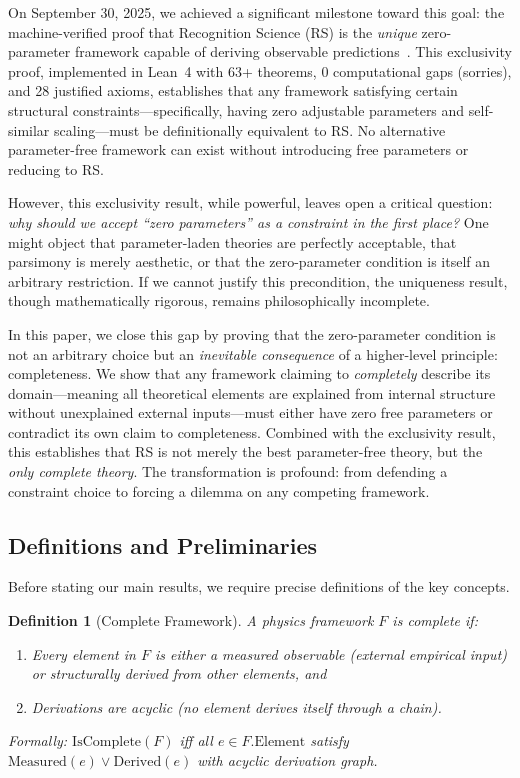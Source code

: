 \documentclass[12pt]{article}
\newtheorem{definition}[theorem]{Definition}
\theoremstyle{remark}
\begin{document}
On September 30, 2025, we achieved a significant milestone toward this goal: the machine-verified proof that Recognition Science (RS) is the \emph{unique} zero-parameter framework capable of deriving observable predictions~\cite{Washburn2025Exclusivity}. This exclusivity proof, implemented in Lean~4 with 63+ theorems, 0 computational gaps (sorries), and 28 justified axioms, establishes that any framework satisfying certain structural constraints---specifically, having zero adjustable parameters and self-similar scaling---must be definitionally equivalent to RS. No alternative parameter-free framework can exist without introducing free parameters or reducing to RS.

However, this exclusivity result, while powerful, leaves open a critical question: \emph{why should we accept ``zero parameters'' as a constraint in the first place?} One might object that parameter-laden theories are perfectly acceptable, that parsimony is merely aesthetic, or that the zero-parameter condition is itself an arbitrary restriction. If we cannot justify this precondition, the uniqueness result, though mathematically rigorous, remains philosophically incomplete.

In this paper, we close this gap by proving that the zero-parameter condition is not an arbitrary choice but an \emph{inevitable consequence} of a higher-level principle: completeness. We show that any framework claiming to \emph{completely} describe its domain---meaning all theoretical elements are explained from internal structure without unexplained external inputs---must either have zero free parameters or contradict its own claim to completeness. Combined with the exclusivity result, this establishes that RS is not merely the best parameter-free theory, but the \emph{only complete theory}. The transformation is profound: from defending a constraint choice to forcing a dilemma on any competing framework.

\subsection{Definitions and Preliminaries}

Before stating our main results, we require precise definitions of the key concepts.

\begin{definition}[Complete Framework]\label{def:complete}
A physics framework $F$ is \emph{complete} if:
\begin{enumerate}
\item[(i)] Every element in $F$ is either a measured observable (external empirical input) or structurally derived from other elements, and
\item[(ii)] Derivations are acyclic (no element derives itself through a chain).
\end{enumerate}
Formally: $\mathrm{IsComplete}(F)$ iff all $e \in F.\mathrm{Element}$ satisfy $\mathrm{Measured}(e) \lor \mathrm{Derived}(e)$ with acyclic derivation graph.
\end{definition}
\end{document}
